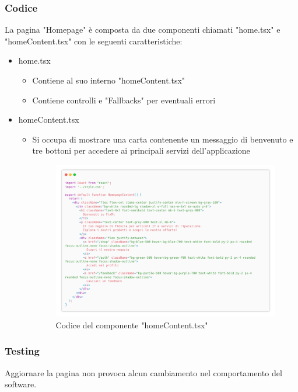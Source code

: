 \documentclass{report}
\begin{document}
\subsubsection*{Codice}
La pagina "Homepage" è composta da due componenti chiamati "home.tsx" e "homeContent.tsx" con le seguenti caratteristiche:
\begin{itemize}
	\item home.tsx
	\begin{itemize}
		\item Contiene al suo interno "homeContent.tsx"
		\item Contiene controlli e "Fallbacks" per eventuali errori
	\end{itemize}
	\item homeContent.tsx
	\begin{itemize}
		\item Si occupa di mostrare una carta contenente un messaggio di benvenuto e tre bottoni per accedere ai principali servizi dell'applicazione
		\begin{figure}[H]
			\centering\includegraphics[width=1\textwidth]{images/microservizio-home/frontend/homeContent-carbon.png}
			Codice del componente "homeContent.tsx"
		\end{figure}
	\end{itemize}
\end{itemize}

\subsubsection*{Testing}
Aggiornare la pagina non provoca alcun cambiamento nel comportamento del software.
\end{document}
